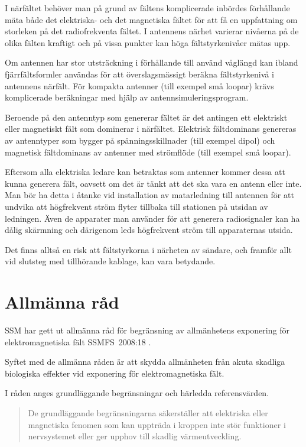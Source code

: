I närfältet behöver man på grund av fältens komplicerade inbördes förhållande
mäta både det elektriska- och det magnetiska fältet för att få en uppfattning
om storleken på det radiofrekventa fältet.
I antennens närhet varierar nivåerna på de olika fälten kraftigt och på vissa
punkter kan höga fältstyrkenivåer mätas upp.

Om antennen har stor utsträckning i förhållande till använd våglängd kan ibland
fjärrfältsformler användas för att överslagsmässigt beräkna fältstyrkenivå i
antennens närfält.
För kompakta antenner (till exempel små loopar) krävs komplicerade beräkningar
med hjälp av antennsimuleringsprogram.

Beroende på den antenntyp som genererar fältet är det antingen ett elektriskt
eller magnetiskt fält som dominerar i närfältet.
Elektrisk fältdominans genereras av antenntyper som bygger på
spänningsskillnader (till exempel dipol) och magnetisk fältdominans av antenner
med strömflöde (till exempel små loopar).

Eftersom alla elektriska ledare kan betraktas som antenner kommer dessa att
kunna generera fält, oavsett om det är tänkt att det ska vara en antenn eller
inte.
Man bör ha detta i åtanke vid installation av matarledning till antennen för
att undvika att högfrekvent ström flyter tillbaka till stationen på utsidan av
ledningen.
Även de apparater man använder för att generera radiosignaler kan ha dålig
skärmning och därigenom leds högfrekvent ström till apparaternas utsida.

Det finns alltså en risk att fältstyrkorna i närheten av sändare, och
framför allt vid slutsteg med tillhörande kablage, kan vara betydande.

\section{Allmänna råd}

SSM har gett ut allmänna råd för begränsning av allmänhetens exponering
för elektromagnetiska fält SSMFS~2008:18 \cite{SSMFS2008:18}.

Syftet med de allmänna råden är att skydda allmänheten från akuta
skadliga biologiska effekter vid exponering för elektromagnetiska fält.

I råden anges grundläggande begränsningar och härledda referensvärden.

\begin{quote}
	De grundläggande begränsningarna säkerställer att elektriska eller
	magnetiska fenomen som kan uppträda i kroppen inte stör funktioner i
	nervsystemet eller ger upphov till skadlig värmeutveckling.
\end{quote}

